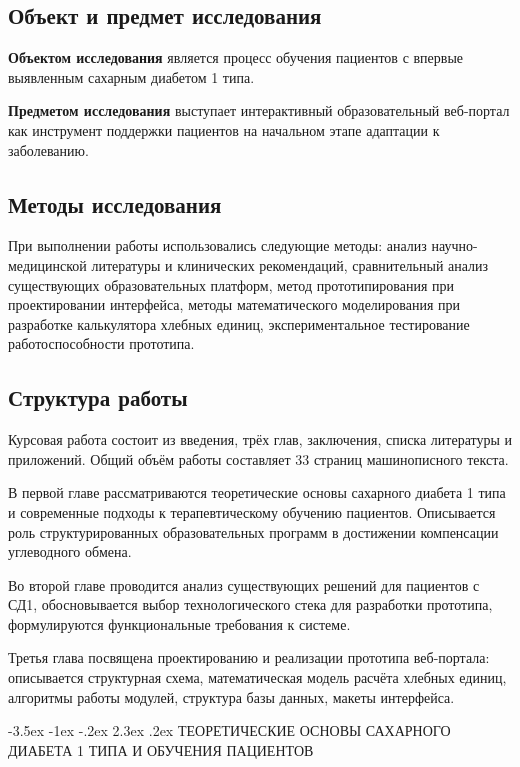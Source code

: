 \documentclass[14pt, a4paper]{extarticle}
\makeatletter
\renewcommand\section{\@startsection {section}{1}{\z@}%
{-3.5ex \@plus -1ex \@minus -.2ex}%
{2.3ex \@plus.2ex}%
{\centering\normalfont\Large\bfseries}}
\makeatother
\begin{document}
\subsection*{Объект и предмет исследования}

\noindent \textbf{Объектом исследования} является процесс обучения пациентов с впервые выявленным сахарным диабетом 1 типа.

\medskip
\noindent \textbf{Предметом исследования} выступает интерактивный образовательный веб-портал как инструмент поддержки пациентов на начальном этапе адаптации к заболеванию.

\subsection*{Методы исследования}

\noindent При выполнении работы использовались следующие методы: анализ научно-медицинской литературы и клинических рекомендаций, сравнительный анализ существующих образовательных платформ, метод прототипирования при проектировании интерфейса, методы математического моделирования при разработке калькулятора хлебных единиц, экспериментальное тестирование работоспособности прототипа.
\vskip 5cm
\subsection*{Структура работы}

\noindent Курсовая работа состоит из введения, трёх глав, заключения, списка литературы и приложений. Общий объём работы составляет 33 страниц машинописного текста.

\medskip
\noindent В первой главе рассматриваются теоретические основы сахарного диабета 1 типа и современные подходы к терапевтическому обучению пациентов. Описывается роль структурированных образовательных программ в достижении компенсации углеводного обмена.

\medskip
\noindent Во второй главе проводится анализ существующих решений для пациентов с СД1, обосновывается выбор технологического стека для разработки прототипа, формулируются функциональные требования к системе.

\medskip
\noindent Третья глава посвящена проектированию и реализации прототипа веб-портала: описывается структурная схема, математическая модель расчёта хлебных единиц, алгоритмы работы модулей, структура базы данных, макеты интерфейса.

\newpage
\section{ТЕОРЕТИЧЕСКИЕ ОСНОВЫ САХАРНОГО ДИАБЕТА 1 ТИПА И ОБУЧЕНИЯ ПАЦИЕНТОВ}
\end{document}
